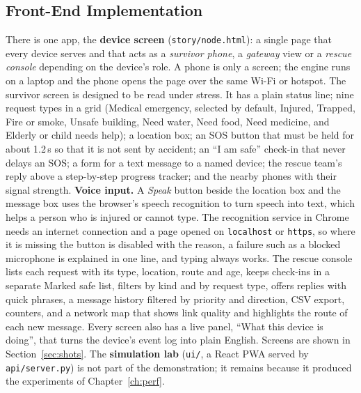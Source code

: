 \subsection{Front-End Implementation}
There is one app, the \textbf{device screen} (\texttt{story/node.html}): a single page that every device serves and that acts as a \emph{survivor phone}, a \emph{gateway} view or a \emph{rescue console} depending on the device's role. A phone is only a screen; the engine runs on a laptop and the phone opens the page over the same Wi-Fi or hotspot. The survivor screen is designed to be read under stress. It has a plain status line; nine request types in a grid (Medical emergency, selected by default, Injured, Trapped, Fire or smoke, Unsafe building, Need water, Need food, Need medicine, and Elderly or child needs help); a location box; an SOS button that must be held for about 1.2\,s so that it is not sent by accident; an ``I am safe'' check-in that never delays an SOS; a form for a text message to a named device; the rescue team's reply above a step-by-step progress tracker; and the nearby phones with their signal strength. \textbf{Voice input.} A \emph{Speak} button beside the location box and the message box uses the browser's speech recognition to turn speech into text, which helps a person who is injured or cannot type. The recognition service in Chrome needs an internet connection and a page opened on \texttt{localhost} or \texttt{https}, so where it is missing the button is disabled with the reason, a failure such as a blocked microphone is explained in one line, and typing always works. The rescue console lists each request with its type, location, route and age, keeps check-ins in a separate Marked safe list, filters by kind and by request type, offers replies with quick phrases, a message history filtered by priority and direction, CSV export, counters, and a network map that shows link quality and highlights the route of each new message. Every screen also has a live panel, ``What this device is doing'', that turns the device's event log into plain English. Screens are shown in Section~\ref{sec:shots}. The \textbf{simulation lab} (\texttt{ui/}, a React PWA served by \texttt{api/server.py}) is not part of the demonstration; it remains because it produced the experiments of Chapter~\ref{ch:perf}.

